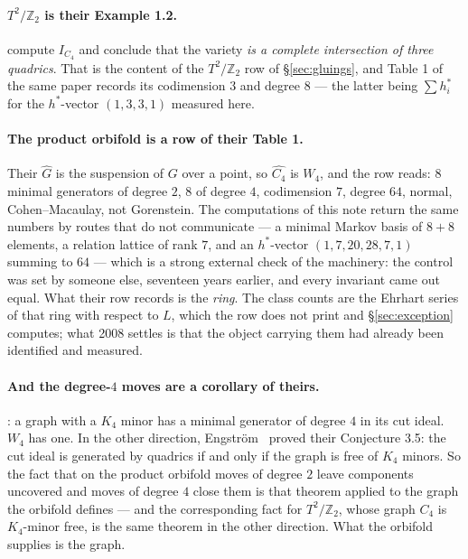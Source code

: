 \documentclass[11pt,a4paper]{article}
\theoremstyle{definition}
\newcommand{\ZZ}{\mathbb{Z}}
\begin{document}
\paragraph{$T^2/\ZZ_2$ is their Example 1.2.} \cite{SScuts} compute $I_{C_4}$ and conclude that the
variety \emph{is a complete intersection of three quadrics}. That is the content of the $T^2/\ZZ_2$
row of \S\ref{sec:gluings}, and Table 1 of the same paper records its codimension $3$ and degree
$8$ --- the latter being $\sum h^*_i$ for the $h^*$-vector $(1,3,3,1)$ measured here.

\paragraph{The product orbifold is a row of their Table 1.} Their $\widehat{G}$ is the suspension of
$G$ over a point, so $\widehat{C_4}$ is $W_4$, and the row reads: $8$ minimal generators of degree
$2$, $8$ of degree $4$, codimension $7$, degree $64$, normal, Cohen--Macaulay, not Gorenstein. The
computations of this note return the same numbers by routes that do not communicate --- a minimal
Markov basis of $8+8$ elements, a relation lattice of rank $7$, and an $h^*$-vector
$(1,7,20,28,7,1)$ summing to $64$ --- which is a strong external check of the machinery: the
control was set by someone else, seventeen years earlier, and every invariant came out equal. What
their row records is the \emph{ring}. The class counts are the Ehrhart series of that ring with
respect to $L$, which the row does not print and \S\ref{sec:exception} computes; what 2008 settles
is that the object carrying them had already been identified and measured.

\paragraph{And the degree-$4$ moves are a corollary of theirs.} \cite[Cor.~3.3(2)]{SScuts}: a graph
with a $K_4$ minor has a minimal generator of degree $4$ in its cut ideal. $W_4$ has one. In the
other direction, Engstr\"om~\cite{Engstrom} proved their Conjecture 3.5: the cut ideal is generated
by quadrics if and only if the graph is free of $K_4$ minors. So the fact that on the product
orbifold moves of degree $2$ leave components uncovered and moves of degree $4$ close them is that
theorem applied to the graph the orbifold defines --- and the corresponding fact for $T^2/\ZZ_2$, whose
graph $C_4$ is $K_4$-minor free, is the same theorem in the other direction. What the orbifold
supplies is the graph.
\end{document}

